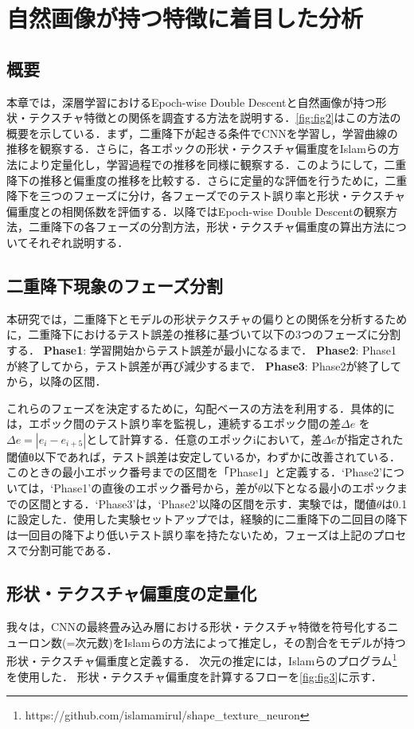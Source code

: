 \chapter{自然画像が持つ特徴に着目した分析}
\section{概要}
本章では，深層学習におけるEpoch-wise Double Descentと自然画像が持つ形状・テクスチャ特徴との関係を調査する方法を説明する．\cref{fig:fig2}はこの方法の概要を示している．まず，二重降下が起きる条件でCNNを学習し，学習曲線の推移を観察する．さらに，各エポックの形状・テクスチャ偏重度をIslamらの方法により定量化し，学習過程での推移を同様に観察する．このようにして，二重降下の推移と偏重度の推移を比較する．さらに定量的な評価を行うために，二重降下を三つのフェーズに分け，各フェーズでのテスト誤り率と形状・テクスチャ偏重度との相関係数を評価する．以降ではEpoch-wise Double Descentの観察方法，二重降下の各フェーズの分割方法，形状・テクスチャ偏重度の算出方法についてそれぞれ説明する．
\section{二重降下現象のフェーズ分割}
\label{sec:Phase division of double descent} 
本研究では，二重降下とモデルの形状テクスチャの偏りとの関係を分析するために，二重降下におけるテスト誤差の推移に基づいて以下の3つのフェーズに分割する．
\textbf{Phase1}: 学習開始からテスト誤差が最小になるまで．
\textbf{Phase2}: Phase1が終了してから，テスト誤差が再び減少するまで．
\textbf{Phase3}: Phase2が終了してから，以降の区間．

これらのフェーズを決定するために，勾配ベースの方法を利用する．具体的には，エポック間のテスト誤り率を監視し，連続するエポック間の差$\Delta e$ を $\Delta e=\left|e_i-e_{i+5}\right|$として計算する．任意のエポックiにおいて，差$\Delta e$が指定された閾値θ以下であれば，テスト誤差は安定しているか，わずかに改善されている．このときの最小エポック番号までの区間を「Phase1」と定義する．`Phase2'については，`Phase1'の直後のエポック番号から，差が$\theta$以下となる最小のエポックまでの区間とする．`Phase3'は，`Phase2'以降の区間を示す．実験では，閾値$\theta$は0.1に設定した．使用した実験セットアップでは，経験的に二重降下の二回目の降下は一回目の降下より低いテスト誤り率を持たないため，フェーズは上記のプロセスで分割可能である．

\section{形状・テクスチャ偏重度の定量化}
\label{sec:形状・テクスチャ偏重度の定量化}
我々は，CNNの最終畳み込み層における形状・テクスチャ特徴を符号化するニューロン数(=次元数)をIslamらの方法\cite{Islam}によって推定し，その割合をモデルが持つ形状・テクスチャ偏重度と定義する．
次元の推定には，Islamらのプログラム\footnote{https://github.com/islamamirul/shape\_texture\_neuron}を使用した．
形状・テクスチャ偏重度を計算するフローを\cref{fig:fig3}に示す．

